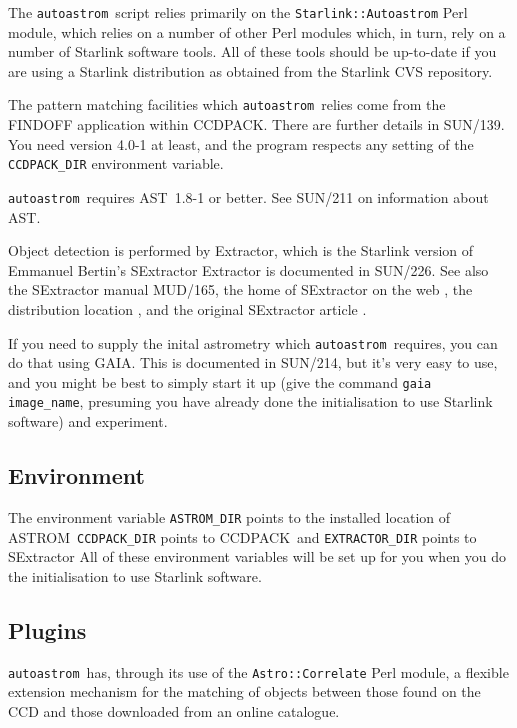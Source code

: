 \documentclass[twoside,11pt]{article}
\newcommand{\xref}[3]{#1}
\newcommand{\xlabel}[1]{}
\newcommand{\AST}{\xref{{\footnotesize AST}}{sun210}{}}
\newcommand{\ASTROM}{{\footnotesize ASTROM}\normalsize}
\newcommand{\autoastrom}{\texttt{autoastrom}}
\newcommand{\CCDPACKref}{\xref{{\footnotesize CCDPACK}}{sun139}{}}
\newcommand{\GAIA}{{\footnotesize GAIA}\normalsize}
\newcommand{\SExtractor}{\xref{{\footnotesize SExtractor}}{sun226}}
\begin{document}
The \autoastrom\ script relies primarily on the \texttt{Starlink::Autoastrom}
Perl module, which relies on a number of other Perl modules which, in turn,
rely on a number of Starlink software tools. All of these tools should be
up-to-date if you are using a Starlink distribution as obtained from the
Starlink CVS repository.

The pattern matching facilities which \autoastrom\ relies come from the
FINDOFF application within \CCDPACKref. There are further details in
SUN/139. You need version 4.0-1 at least, and the program respects any setting
of the \texttt{CCDPACK\_DIR} environment variable.

\autoastrom\ requires \AST\ 1.8-1 or better. See SUN/211 on information about
AST.

Object detection is performed by Extractor, which is the Starlink version of
Emmanuel Bertin's \SExtractor. Extractor is documented in SUN/226. See also
the SExtractor manual MUD/165, the home of SExtractor on the web
\cite{sextractor-web}, the distribution location \cite{sextractor-ftp}, and
the original SExtractor article \cite{sextractor-article}.

If you need to supply the inital astrometry which \autoastrom\ requires, you
can do that using \GAIA. This is documented in SUN/214, but it's very easy to
use, and you might be best to simply start it up (give the command
\texttt{gaia image\_name}, presuming you have already done the initialisation
to use Starlink software) and experiment.

\subsection{\xlabel{sb_environment}Environment\label{sb:environment}}

The environment variable \texttt{ASTROM\_DIR} points to the installed location
of \ASTROM\, \texttt{CCDPACK\_DIR} points to \CCDPACKref\, and
\texttt{EXTRACTOR\_DIR} points to \SExtractor. All of these environment
variables will be set up for you when you do the initialisation to use
Starlink software.

\subsection{\xlabel{sb_plugins}Plugins\label{sb:plugins}}

\autoastrom\ has, through its use of the \texttt{Astro::Correlate} Perl
module, a flexible extension mechanism for the matching of objects between
those found on the CCD and those downloaded from an online catalogue.
\end{document}
